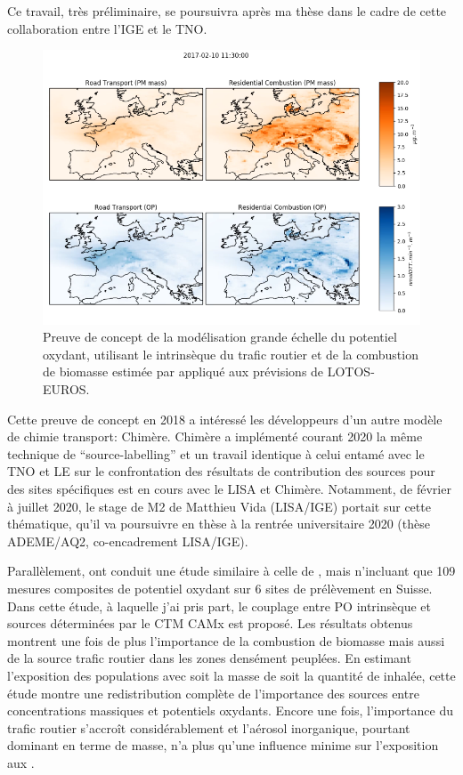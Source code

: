 Ce travail, très préliminaire, se poursuivra après ma thèse dans le cadre de cette
collaboration entre l'IGE et le TNO.

\begin{figure}[ht]
    \centering
    \includegraphics[width=0.8\linewidth]{figures/chapter05/OPmap.png}
    \caption{Preuve de concept de la modélisation grande échelle du potentiel oxydant,
    utilisant le \PODTT{} intrinsèque du trafic routier et de la combustion de biomasse
estimée par \cite{weberSourceinprep.} appliqué aux prévisions de LOTOS-EUROS.}%
    \label{fig:OPmap}
\end{figure}

Cette preuve de concept en 2018 a intéressé les développeurs
d'un autre modèle de chimie transport: Chimère. Chimère a implémenté courant 2020 la
même technique de ``source-labelling'' et un travail identique à celui entamé avec le TNO
et LE sur le confrontation des résultats de contribution des sources pour des sites
spécifiques est en cours avec le LISA et Chimère. Notamment, de février à juillet 2020, le
stage de M2 de Matthieu Vida (LISA/IGE) portait sur cette thématique, qu'il va poursuivre en thèse à
la rentrée universitaire 2020 (thèse ADEME/AQ2, co-encadrement LISA/IGE).

Parallèlement, \cite{daellenbachSourcessubmitted} ont conduit une étude similaire à celle
de \cite{weberSourceinprep.}, mais n'incluant que 109 mesures composites de potentiel
oxydant sur 6 sites de prélèvement en Suisse. Dans cette étude, à laquelle j'ai pris
part, le couplage entre PO intrinsèque et sources déterminées par le CTM CAMx est proposé.
Les résultats obtenus montrent une fois de plus
l'importance de la combustion de biomasse mais aussi de la source trafic routier dans
les zones densément peuplées. En estimant l'exposition des populations avec soit la masse de
\PMdix{} soit la quantité de \POv{} inhalée, cette étude montre une
redistribution complète de l'importance des sources entre concentrations massiques et
potentiels oxydants. Encore une fois, l'importance du trafic routier s'accroît
considérablement et l'aérosol inorganique, pourtant dominant en terme de masse, n'a plus
qu'une influence minime sur l'exposition aux \POv.

